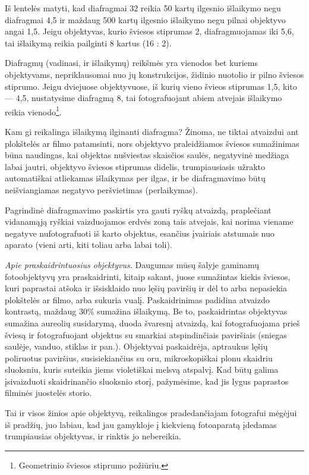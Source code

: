 \documentclass[12pt]{book}
\begin{document}
					Iš lentelės matyti, kad diafragmai 32 reikia 50 kartų ilgesnio išlaikymo negu diafragmai 4,5 ir maždaug 500 kartų ilgesnio išlaikymo negu pilnai objektyvo angai 1,5. Jeigu objektyvas, kurio šviesos stiprumas 2, diafragmuojamas iki 5,6, tai išlaikymą reikia pailginti 8 kartus (16 : 2).

					Diafragmų (vadinasi, ir išlaikymų) reikšmės yra vienodos bet kuriems objektyvams, nepriklausomai nuo jų konstrukcijos, židinio nuotolio ir pilno šviesos stiprumo. Jeigu dviejuose objektyvuose, iš kurių vieno švieos stiprumas 1,5, kito --- 4,5, nustatysime diafragmą 8, tai fotografuojant abiem atvejais išlaikymo reikia vienodo\footnote{Geometrinio šviesos stiprumo požiūriu.}.

					Kam gi reikalinga išlaikymą ilginanti diafragma? Žinoma, ne tiktai atvaizdui ant plokštelės ar filmo patamsinti, nors objektyvo praleidžiamos šviesos sumažinimas būna naudingas, kai objektas nušviestas skaisčios saulės, negatyvinė medžiaga labai jautri, objektyvo šviesos stiprumas didelis, trumpiausiasis užrakto automatiškai atliekamas išlaikymas per ilgas, ir be diafragmavimo būtų neišviangiamas negatyvo peršvietimas (perlaikymas).

					Pagrindinė diafragmavimo paskirtis yra gauti ryškų atvaizdą, praplečiant vidanamąją ryškiai vaizduojamos erdvės zoną tais atvejais, kai norima viename negatyve nufotografuoti iš karto objektus, esančius įvairiais atstumais nuo aparato (vieni arti, kiti toliau arba labai toli).

					\textit{Apie praskaidrintuosius objektyvus.} Daugumas mūsų šalyje gaminamų fotoobjektyvų yra praskaidrinti, kitaip sakant, juose sumažintas kiekis šviesos, kuri paprastai atšoka ir išsisklaido nuo lęšių paviršių ir dėl to arba nepasiekia plokštelės ar filmo, arba sukuria vualį. Paskaidrinimas padidina atvaizdo kontrastą, maždaug 30\% sumažina išlaikymą. Be to, paskaidrintas objektyvas sumažina aureolių susidarymą, duoda švaresnį atvaizdą, kai fotografuojama prieš šviesą ir fotografuojant objektus su smarkiai atspindinčiais paviršiais (sniegas saulėje, vanduo, stiklas ir pan.). Objektyvai paskaidrėja, aptraukus lęšių poliruotus paviršius, susisiekiančius su oru, mikroskopiškai plonu skaidriu sluoksniu, kuris suteikia jiems violetiškai melsvą atspalvį. Kad būtų galima įsivaizduoti skaidrinančio sluoksnio storį, pažymėsime, kad jis lygus  paprastos filminės juostelės storio.

					Tai ir visos žinios apie objektyvą, reikalingos pradedančiajam fotografui mėgėjui iš pradžių, juo labiau, kad jau gamykloje į kiekvieną fotoaparatą įdedamas trumpiausias objektyvas, ir rinktis jo nebereikia.
\end{document}
